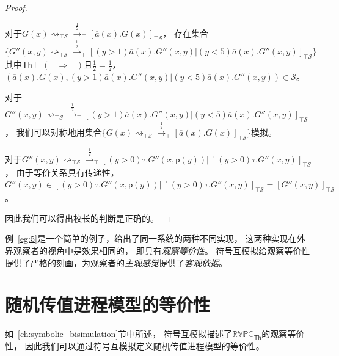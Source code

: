 \begin{proof}
\begin{itemize}
{         对于$G(x)\rightsquigarrow_{\top\mathcal{S}}\stackrel{\frac{1}{2}}{\rightarrow}_{\top} [\overline{a}(x).G(x)]_{\top\mathcal{S}}$，
         存在集合$$\{G''(x,y)\rightsquigarrow_{\top\mathcal{S}}\stackrel{\frac{1}{2}}{\rightarrow}_{\top}[(y>1)\overline{a}(x).G''(x,y)|(y<5)\overline{a}(x).G''(x,y)]_{\top\mathcal{S}}\}$$
         其中$\mathsf{Th}\vdash (\top\Rightarrow\top)$且$\frac{1}{2}=\frac{1}{2}$，$(\overline{a}(x).G(x),(y>1)\overline{a}(x).G''(x,y)|(y<5)\overline{a}(x).G''(x,y))\in\mathcal{S}$。

         对于$G''(x,y)\rightsquigarrow_{\top\mathcal{S}}\stackrel{\frac{1}{2}}{\rightarrow}_{\top}[(y>1)\overline{a}(x).G''(x,y)|(y<5)\overline{a}(x).G''(x,y)]_{\top\mathcal{S}}$，
         我们可以对称地用集合$\{G(x)\rightsquigarrow_{\top\mathcal{S}}\stackrel{\frac{1}{2}}{\rightarrow}_{\top} [\overline{a}(x).G(x)]_{\top\mathcal{S}}\}$模拟。

         对于$G''(x,y)\rightsquigarrow_{\top\mathcal{S}}\stackrel{\frac{1}{2}}{\rightarrow}_{\top}[(y>0)\tau.G''(x,\mathsf{p}(y))|\urcorner(y>0)\tau.G''(x,y)]_{\top\mathcal{S}}$，
         由于等价关系具有传递性，$G''(x,y) \in [(y>0)\tau.G''(x,\mathsf{p}(y))|\urcorner(y>0)\tau.G''(x,y)]_{\top\mathcal{S}} = [G''(x,y)]_{\top\mathcal{S}}$。
      }
   \end{itemize}
   因此我们可以得出校长的判断是正确的。
\end{proof}
例~\ref{eg:5}是一个简单的例子，给出了同一系统的两种不同实现，
这两种实现在外界观察者的视角中是效果相同的，
即具有\textit{观察等价性}。
符号互模拟给观察等价性提供了严格的刻画，为观察者的\textit{主观感觉}提供了\textit{客观依据}。

\section{随机传值进程模型的等价性}

如~\ref{ch:symbolic_bisimulation}节中所述，
符号互模拟描述了$\mathbb{RVPC}_{\mathsf{Th}}$的观察等价性，
因此我们可以通过符号互模拟定义随机传值进程模型的等价性。

